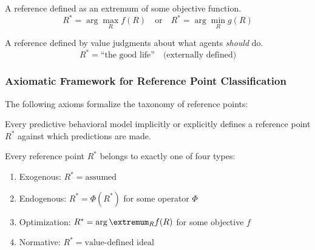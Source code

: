 \begin{definition}
\label{def:AY-optimization}
A reference defined as an extremum of some objective function.
\begin{equation}
R^* = \arg\max_R f(R) \quad \text{or} \quad R^* = \arg\min_R g(R)
\end{equation}
\end{definition}

\begin{definition}
\label{def:AY-normative}
A reference defined by value judgments about what agents \emph{should} do.
\begin{equation}
R^* = \text{``the good life''} \quad \text{(externally defined)}
\end{equation}
\end{definition}



\subsubsection{Axiomatic Framework for Reference Point Classification}

The following axioms formalize the taxonomy of reference points:

\begin{axiom}
\label{ax:AY-existence}
Every predictive behavioral model implicitly or explicitly defines a reference
point $R^*$ against which predictions are made.
\end{axiom}

\begin{axiom}
\label{ax:AY-classification}
Every reference point $R^*$ belongs to exactly one of four types:
\begin{enumerate}[nosep]
    \item Exogenous: $R^* = \text{assumed}$
    \item Endogenous: $R^* = \Phi(R^*)$ for some operator $\Phi$
    \item Optimization: $R^* = \arg\extremum_R f(R)$ for some objective $f$
    \item Normative: $R^* = \text{value-defined ideal}$
\end{enumerate}
\end{axiom}

